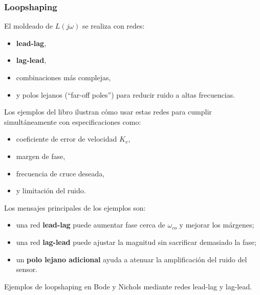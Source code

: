 \subsubsection{Loopshaping}
El moldeado de \(L(j\omega)\) se realiza con redes:

\begin{itemize}
  \item \textbf{lead-lag},
  \item \textbf{lag-lead},
  \item combinaciones más complejas,
  \item y polos lejanos (“far-off poles”) para reducir ruido a altas frecuencias.
\end{itemize}

Los ejemplos del libro ilustran cómo usar estas redes para cumplir simultáneamente con especificaciones como:

\begin{itemize}
  \item coeficiente de error de velocidad \(K_v\),
  \item margen de fase,
  \item frecuencia de cruce deseada,
  \item y limitación del ruido.
\end{itemize}

Los mensajes principales de los ejemplos son:

\begin{itemize}
  \item una red \textbf{lead-lag} puede aumentar fase cerca de \(\omega_{co}\) y mejorar los márgenes;
  \item una red \textbf{lag-lead} puede ajustar la magnitud sin sacrificar demasiado la fase;
  \item un \textbf{polo lejano adicional} ayuda a atenuar la amplificación del ruido del sensor.
\end{itemize}

\begin{images}[\label{img:loopshaping-bode-nichols}]{Ejemplos de loopshaping en Bode y Nichols mediante redes lead-lag y lag-lead.}
  \imagesnewline
  \imagesnewline
  \imagesnewline
  \imagesnewline
\end{images}

